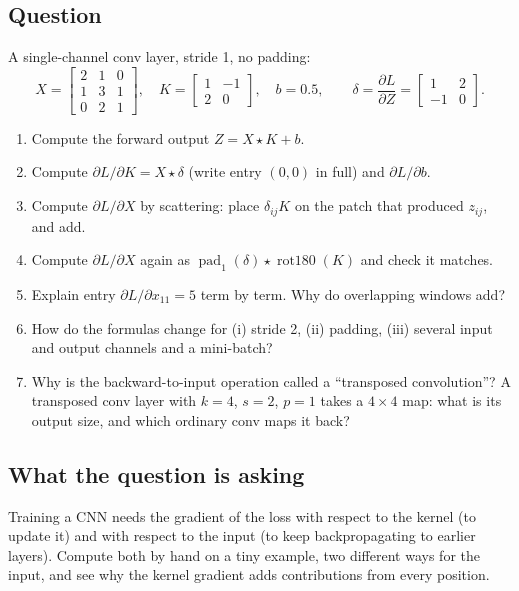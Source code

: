 \documentclass[12pt,a4paper]{article}
\newcommand{\rot}{\operatorname{rot180}}
\newcommand{\hlq}[1]{{\setlength{\fboxsep}{1.5pt}\colorbox{yellow}{#1}}}
\begin{document}
\subsection*{Question}
A single-channel conv layer, stride 1, no padding:
\[
X=\begin{bmatrix}2&1&0\\1&3&1\\0&2&1\end{bmatrix},\quad K=\begin{bmatrix}1&-1\\2&0\end{bmatrix},\quad b=0.5,\qquad
\delta=\frac{\partial L}{\partial Z}=\begin{bmatrix}1&2\\-1&0\end{bmatrix}.
\]
\begin{enumerate}[label=(\alph*)]
\item[(a)] Compute the forward output $Z=X\star K+b$.
\item[(b)] Compute $\partial L/\partial K=X\star\delta$ (write entry $(0,0)$ in full) and $\partial L/\partial b$.
\item[(c)] Compute $\partial L/\partial X$ by scattering: place $\delta_{ij}K$ on the patch that produced $z_{ij}$, and add.
\item[\hlq{(d)}] Compute $\partial L/\partial X$ again as $\operatorname{pad}_1(\delta)\star\rot(K)$ and check it matches.
\item[\hlq{(e)}] Explain entry $\partial L/\partial x_{11}=5$ term by term. Why do overlapping windows add?
\item[\hlq{(f)}] How do the formulas change for (i) stride 2, (ii) padding, (iii) several input and output channels and a mini-batch?
\item[\hlq{(g)}] Why is the backward-to-input operation called a ``transposed convolution''? A transposed conv layer with $k=4$, $s=2$, $p=1$ takes a $4\times4$ map: what is its output size, and which ordinary conv maps it back?
\end{enumerate}

\subsection*{What the question is asking}
Training a CNN needs the gradient of the loss with respect to the kernel (to update it) and with respect to the input (to keep backpropagating to earlier layers). Compute both by hand on a tiny example, two different ways for the input, and see why the kernel gradient adds contributions from every position.
\end{document}
